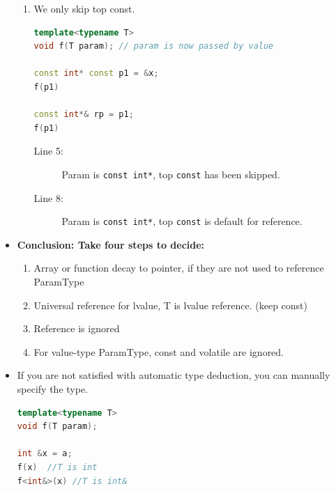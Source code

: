 \documentclass[a4paper,11pt,twoside]{book}
\begin{document}
\begin{itemize}
\begin{enumerate}
	\item We only skip top const. 
\begin{lstlisting}[frame=single, language=c++]
template<typename T>
void f(T param); // param is now passed by value
	
const int* const p1 = &x;
f(p1)  
	
const int*& rp = p1;
f(p1)  
\end{lstlisting}
\begin{description}
	\item[Line 5:] Param is \texttt{const int*}, top \texttt{const} has been skipped. 
	\item[Line 8:] Param is \texttt{const int*}, top \texttt{const} is default for reference. 
\end{description}
	\end{enumerate}
	
	\item \textbf{Conclusion:  Take four steps to decide:}
	\begin{enumerate}
		\item Array or function decay to pointer, if they are not used to reference ParamType
		\item Universal reference for lvalue, T is lvalue reference. (keep const)
		\item Reference is ignored
		\item For value-type ParamType, const and volatile are ignored.
	\end{enumerate}
	
	\item If you are not satisfied with automatic type deduction, you can manually specify the type.  
\begin{lstlisting}[frame=single, language=c++]
template<typename T>
void f(T param); 
	
int &x = a;
f(x)  //T is int
f<int&>(x) //T is int&
\end{lstlisting}

\end{itemize}
	
\end{document}

